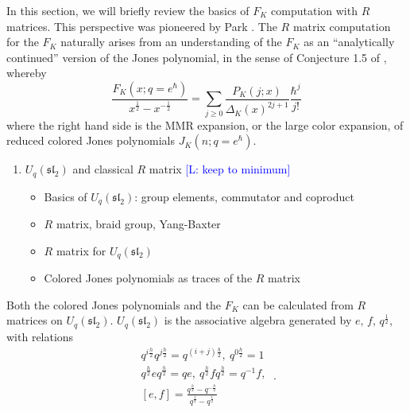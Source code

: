 \documentclass[twocolumn]{article}
\newcommand{\Lara}[1]{\textcolor{blue}{[L: #1]}}
\begin{document}
In this section, we will briefly review the basics of $F_K$ computation with $R$ matrices.
This perspective was pioneered by Park \cite{Park20,Park21}.
The $R$ matrix computation for the $F_K$ naturally arises from an understanding of the $F_K$ as an ``analytically continued'' version of the Jones polynomial, in the sense of Conjecture 1.5 of \cite{GM}, whereby 
\begin{equation}
    \frac{F_K(x;q=e^\hbar)}{x^{\frac{1}{2}}-x^{-\frac{1}{2}}}=\sum_{j\geq 0}\frac{P_K(j;x)}{\Delta_K(x)^{2j+1}}\frac{\hbar^{j}}{j!}
\end{equation}
where the right hand side is the MMR expansion, or the large color expansion, of reduced colored Jones polynomials $J_K(n;q=e^\hbar)$.

\begin{enumerate}
    \item $U_q(\mathfrak{sl}_2)$ and classical $R$ matrix \Lara{keep to minimum}
    \begin{itemize}
        \item Basics of $U_q(\mathfrak{sl}_2)$: group elements, commutator and coproduct
        \item $R$ matrix, braid group, Yang-Baxter
        \item $R$ matrix for $U_q(\mathfrak{sl_2})$
        \item Colored Jones polynomials as traces of the $R$ matrix
    \end{itemize}
\end{enumerate}
Both the colored Jones polynomials and the $F_K$ can be calculated from $R$ matrices on $U_q(\mathfrak{sl}_2)$.
$U_q(\mathfrak{sl}_2)$ is the associative algebra generated by $e,\,f,\,q^{\frac{1}{2}}$,  with relations
\begin{equation}
    \begin{split}
        q^{i\frac{h}{2}}q^{j\frac{h}{2}}=q^{\left(i+j\right)\frac{h}{2}},\ q^{0\frac{h}{2}} = 1 \\
        q^{\frac{h}{2}}eq^{\frac{h}{2}} = qe,\ q^{\frac{h}{2}}fq^{\frac{h}{2}} = q^{-1}f,\\
        \left[e,f\right]  = \frac{q^{\frac{h}{2}}-q^{-\frac{h}{2}}}{q^{\frac{1}{2}}-q^{\frac{1}{2}}}
    \end{split} ~.
\end{equation}
\end{document}
